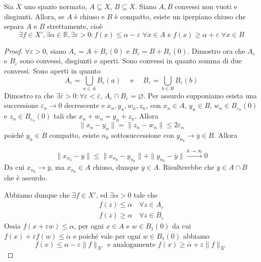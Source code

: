 \begin{theorem}
    Sia \(X\) uno spazio normato, \(A \subseteq X \), \(B \subseteq X \). Siano
    \(A, B\) convessi non vuoti e disgiunti. Allora, se \(A\) è chiuso e \(B\) è
    compatto, esiste un iperpiano chiuso che separa \(A\) e \(B\) strettamente,
    cioè
    \[
      \exists f \in X', \exists \alpha \in \mathbb{R}, \exists \varepsilon > 0 : f{(x)}
      \le \alpha - \varepsilon \,\, \forall x \in A \text{ e } f{(x)} \ge \alpha
      + \varepsilon \,\, \forall x \in B
    \]
\end{theorem}
\begin{proof}{}
    \(\forall \varepsilon > 0\), siano \(A_\varepsilon = A + B_\varepsilon {(0)}\) e
    \(B_\varepsilon = B + B_\varepsilon {(0)}\). Dimostro ora che \(A_\varepsilon\) e \(B_\varepsilon\) sono convessi, disgiunti e aperti. Sono convessi in quanto somma di due convessi.
    Sono aperti in quanto 
    \[
      A_\varepsilon = \bigcup_{a \in A} B_{\varepsilon}{(a)} \quad \text{ e }
      \quad B_\varepsilon = \bigcup_{b \in B} B_\varepsilon {(b)}
    \]
    Dimostro ra che \(\exists \overline{\varepsilon} > 0 : \forall \varepsilon < \overline{\varepsilon}\), \(A_\varepsilon \cap B_\varepsilon = \varnothing\). Per assurdo supponiamo esista una successione \(\varepsilon_n \to 0\) decrescente 
    e \(x_{n}, y_{n}, w_{n}, z_{n}\), con \(x_{n} \in A\), \(y_{n} \in B\), \(w_{n} \in B_{\varepsilon_n}{(0)}\) e \(z_{n} \in B_{\varepsilon_n} {(0)}\) tali che \(x_{n} + w_{n} = y_{n} + z_{n}\).
    Allora 
    \[
      \|x_{n} - y_{n}\| = \|z_{n} - w_{n}\| \le 2 \varepsilon_n
    \]
    poiché \(y_{n} \in B\) compatto, esiste \(n_k\) sottosuccessione con \(y_{n_k} \to \overline{y} \in B\). Allora

    \[
      \|x_{n_k} - \overline{y}\| \le \|x_{n_k} - y_{n_k} \| + \|y_{n_k} - \overline{y}\| \overset{k \to \infty}{\longrightarrow} 0
    \]
    Da cui \(x_{n_k} \to \overline{y}\), ma \(x_{n_k} \in A\) chiuso, dunque \(\overline{y} \in A\). Risulterebbe che \(\overline{y} \in A \cap B\) che è assurdo.

    Abbiamo dunque che \(\exists f \in X'\), ed \(\exists \alpha > 0\) tale che 
    \begin{align*}
      f{(z)} \le \alpha \quad \forall z \in A_\varepsilon \\
      f{(z)} \ge \alpha \quad \forall z \in B_\varepsilon
    \end{align*}
    Ossia \(f{(x + \varepsilon w)} \le \alpha\), per ogni \(x \in A\) e \(w \in B_1{(0)}\) da cui
    \(f{(x)} + \varepsilon f{(w)} \le \alpha\) e poiché vale per ogni \(w \in B_1{(0)}\) abbiamo 
    \[
     f{(x)} \le \alpha - \varepsilon \|f\|_{X'} \text{ e analogamente }
      f{(x)} \ge \alpha + \varepsilon \|f\|_{X'} 
    \]
\end{proof}

